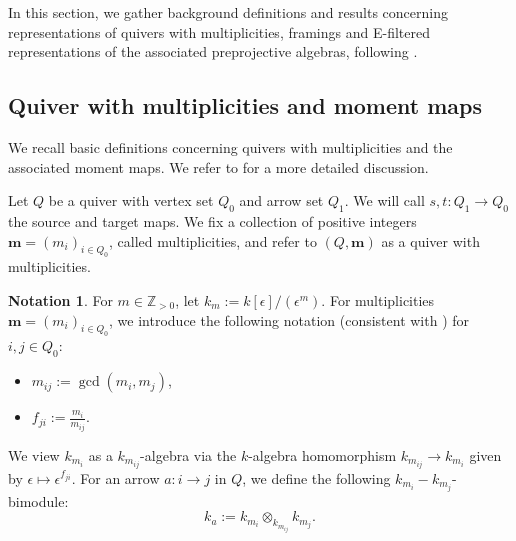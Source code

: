 \documentclass[a4paper,12pt]{article}
\theoremstyle{definition}
\newtheorem{definition}{Definition}[section]
\newtheorem{notation}[definition]{Notation}
\theoremstyle{plain}
\theoremstyle{remark}
\newcommand\bfm{\mathbf{m}}
\newcommand{\comT}[1]{\todo[color=yellow!50,inline]{\textbf{Tanguy:} #1}}
\begin{document}
In this section, we gather background definitions and results concerning representations of quivers with multiplicities, framings and E-filtered representations of the associated preprojective algebras, following \cite{GLS18a,HJV25}.

\subsection{Quiver with multiplicities and moment maps}\label{Sect/QuivMultDefinitions}

We recall basic definitions concerning quivers with multiplicities and the associated moment maps. We refer to \cite{GLS17a,Ver24b,HJV25} for a more detailed discussion.

Let $Q$ be a quiver with vertex set $Q_0$ and arrow set $Q_1$. We will call $s,t:Q_1\rightarrow Q_0$ the source and target maps. We fix a collection of positive integers $\bfm=(m_i)_{i\in Q_0}$, called multiplicities, and refer to $(Q,\bfm)$ as a quiver with multiplicities.



\begin{notation}\label{notation gcd of multiplicities}
For $m \in \mathbb{Z}_{>0}$, let $k_m:=k[\epsilon]/(\epsilon^m)$. For multiplicities $\bfm=(m_i)_{i\in Q_0}$, we introduce the following notation (consistent with \cite{GLS17a}) for $i,j\in Q_0$:
\begin{itemize}
    \item $m_{ij}:=\gcd(m_i,m_j)$,
    \item $f_{ji}:=\frac{m_i}{m_{ij}}$.
\end{itemize}
We view  $k_{m_i}$ as a $k_{m_{ij}}$-algebra via the $k$-algebra homomorphism $k_{m_{ij}} \rightarrow k_{m_i}$ given by $\epsilon\mapsto\epsilon^{f_{ji}}$.
For an arrow $a \colon i\rightarrow j$ in $Q$, we define the following $k_{m_i}-k_{m_j}$-bimodule:
\[
k_a:=k_{m_i}\otimes_{k_{m_{ij}}}k_{m_j}.
\]
\end{notation}
\end{document}
